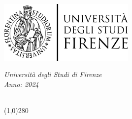 
\newcommand{\image}[3]{ %
	\begin{figure}[h!]
		\centering
		\texttt{[image: \#1]} 
		\caption{#2}
	\end{figure}
	\FloatBarrier
}

\newcommand{\imageLabel}[4]{ %
	\begin{figure}[h!]
		\centering
		\texttt{[image: \#1]} 
		\caption{#2}
		\label{fig:#4}
	\end{figure}
	\FloatBarrier
}
\newcommand{\Z}{\mathbb{Z}}

\begin{titlepage}
	\begin{center}
		\includegraphics[width=0.5\textwidth]{Logo_universita_firenze.svg.png}
		
		\vspace*{1cm}
		\LARGE
		\textit{Università degli Studi di Firenze \\ \center Anno: 2024}
		
		\vspace{0.5cm}
		\Huge{\titolo}
  
        \vspace{0.5 cm}
		\textbf{\sottotitolo}\\
  
        
		
		\line(1,0){280}
		
		\vspace{0.5 cm}
		\LARGE {\nome}
		
		\vfill
		
	\end{center}
	
	
\end{titlepage}


\renewcommand{\headheight}{14pt}

\pagestyle{fancy}
\lhead{}
\chead{}
\rhead{\textbf{\sottotitolo}}
\cfoot{}
\renewcommand{\headrulewidth}{0.4pt}
\renewcommand{\footrulewidth}{0.4pt}

\renewcommand{\labelitemi}{$\diamond$}
\renewcommand{\labelitemii}{$\bullet$}
\renewcommand{\labelitemiii}{$\circ$}


